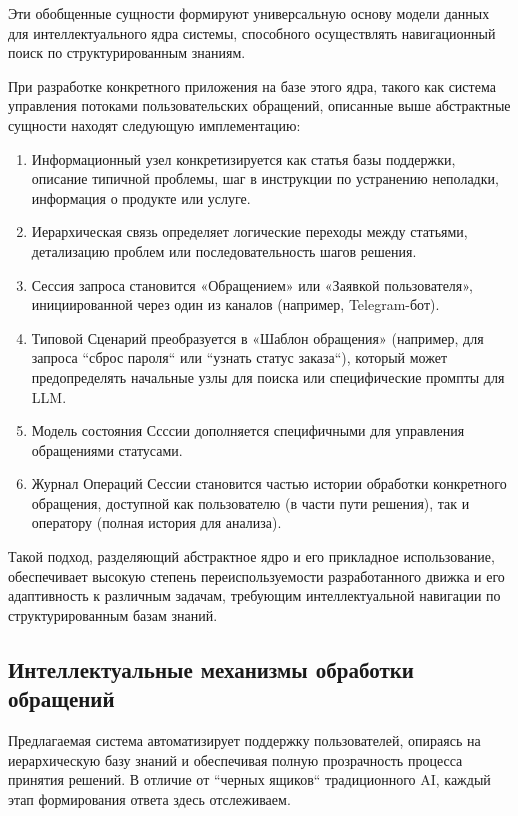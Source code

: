 Эти обобщенные сущности формируют универсальную основу модели данных для интеллектуального ядра системы, способного осуществлять навигационный поиск по структурированным знаниям.

При разработке конкретного приложения на базе этого ядра, такого как система управления потоками пользовательских обращений, описанные выше абстрактные сущности находят следующую имплементацию:

\begin{enumerate}[label=\arabic*.]
    \item Информационный узел конкретизируется как статья базы поддержки, описание типичной проблемы, шаг в инструкции по устранению неполадки, информация о продукте или услуге.

    \item Иерархическая связь определяет логические переходы между статьями, детализацию проблем или последовательность шагов решения.
    
    \item Сессия запроса становится «Обращением» или «Заявкой пользователя», инициированной через один из каналов (например, Telegram-бот).

    \item Типовой Сценарий преобразуется в «Шаблон обращения» (например, для запроса ``сброс пароля`` или ``узнать статус заказа``), который может предопределять начальные узлы для поиска или специфические промпты для LLM.

    \item Модель состояния Ссссии дополняется специфичными для управления обращениями статусами.

    \item Журнал Операций Сессии становится частью истории обработки конкретного обращения, доступной как пользователю (в части пути решения), так и оператору (полная история для анализа).
\end{enumerate}

Такой подход, разделяющий абстрактное ядро и его прикладное использование, обеспечивает высокую степень переиспользуемости разработанного движка и его адаптивность к различным задачам, требующим интеллектуальной навигации по структурированным базам знаний.

\subsection{Интеллектуальные механизмы обработки обращений}

Предлагаемая система автоматизирует поддержку пользователей, опираясь на иерархическую базу знаний и обеспечивая полную прозрачность процесса принятия решений. В отличие от ``черных ящиков`` традиционного AI, каждый этап формирования ответа здесь отслеживаем.

